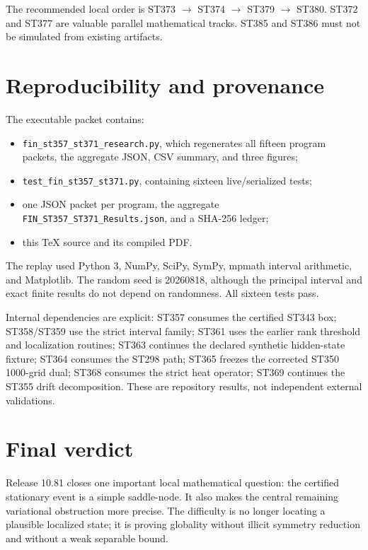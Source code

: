 \documentclass[11pt,a4paper]{article}
\begin{document}
The recommended local order is ST373 $\rightarrow$ ST374 $\rightarrow$ ST379
$\rightarrow$ ST380. ST372 and ST377 are valuable parallel mathematical tracks. ST385 and
ST386 must not be simulated from existing artifacts.

\section{Reproducibility and provenance}

The executable packet contains:
\begin{itemize}
\item \texttt{fin\_st357\_st371\_research.py}, which regenerates all fifteen program packets,
the aggregate JSON, CSV summary, and three figures;
\item \texttt{test\_fin\_st357\_st371.py}, containing sixteen live/serialized tests;
\item one JSON packet per program, the aggregate
\texttt{FIN\_ST357\_ST371\_Results.json}, and a SHA-256 ledger;
\item this TeX source and its compiled PDF.
\end{itemize}

The replay used Python 3, NumPy, SciPy, SymPy, mpmath interval arithmetic, and Matplotlib.
The random seed is 20260818, although the principal interval and exact finite results do not
depend on randomness. All sixteen tests pass.

Internal dependencies are explicit: ST357 consumes the certified ST343 box; ST358/ST359
use the strict interval family; ST361 uses the earlier rank threshold and localization
routines; ST363 continues the declared synthetic hidden-state fixture; ST364 consumes the
ST298 path; ST365 freezes the corrected ST350 1000-grid dual; ST368 consumes the strict heat
operator; ST369 continues the ST355 drift decomposition. These are repository results, not
independent external validations.

\section{Final verdict}

Release 10.81 closes one important local mathematical question: the certified stationary
event is a simple saddle-node. It also makes the central remaining variational obstruction
more precise. The difficulty is no longer locating a plausible localized state; it is
proving globality without illicit symmetry reduction and without a weak separable bound.
\end{document}
